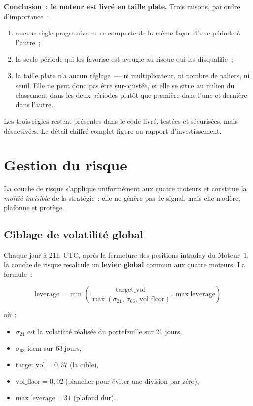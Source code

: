 \documentclass[11pt, a4paper]{scrartcl}
\begin{document}
\begin{insightbox}
\textbf{Conclusion~: le moteur est livré en taille plate.} Trois raisons, par
ordre d'importance~:
\begin{enumerate}
\item aucune règle progressive ne se comporte de la même façon d'une période à
      l'autre~;
\item la seule période qui les favorise est aveugle au risque qui les
      disqualifie~;
\item la taille plate n'a aucun réglage~--- ni multiplicateur, ni nombre de
      paliers, ni seuil. Elle ne peut donc pas être sur-ajustée, et elle se situe
      au milieu du classement dans les deux périodes plutôt que première dans
      l'une et dernière dans l'autre.
\end{enumerate}

\smallskip
Les trois règles restent présentes dans le code livré, testées et sécurisées,
mais désactivées. Le détail chiffré complet figure au rapport d'investissement.
\end{insightbox}


\section{Gestion du risque}
\label{sec:risk}

La couche de risque s'applique uniformément aux quatre moteurs et constitue la \emph{moitié invisible} de la stratégie~: elle ne génère pas de signal, mais elle modère, plafonne et protège.

\subsection{Ciblage de volatilité global}

Chaque jour à 21h~UTC, après la fermeture des positions intraday du Moteur~1, la couche de risque recalcule un \textbf{levier global} commun aux quatre moteurs. La formule~:

\[
\text{leverage} = \min\!\left(\frac{\text{target\_vol}}{\max(\sigma_{21},\,\sigma_{63},\,\text{vol\_floor})},\ \text{max\_leverage}\right)
\]

où~:
\begin{itemize}
\item $\sigma_{21}$ est la volatilité réalisée du portefeuille sur 21 jours,
\item $\sigma_{63}$ idem sur 63 jours,
\item $\text{target\_vol} = 0{,}37$ (la cible),
\item $\text{vol\_floor} = 0{,}02$ (plancher pour éviter une division par zéro),
\item $\text{max\_leverage} = 31$ (plafond dur).
\end{itemize}
\end{document}
